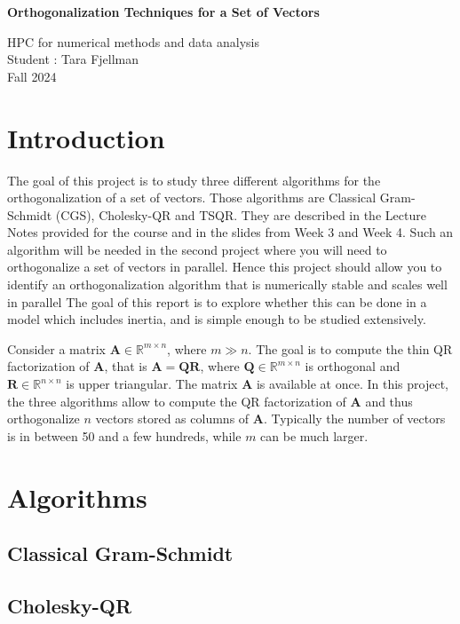 \documentclass[a4paper, 12pt,oneside]{article}
\begin{document}
 
	\begin{center}
	    \Large
	    \textbf{Orthogonalization Techniques for a Set of Vectors}
	        
	    \vspace{0.4cm}
	    \large
		HPC for numerical methods and data analysis \\
	    Student : Tara Fjellman \\
	    \small{Fall 2024}
	\end{center}
	\section{Introduction}
	The goal of this project is to study three different algorithms for the orthogonalization of a set of vectors. Those algorithms are Classical Gram-Schmidt (CGS), Cholesky-QR and TSQR\@. They are described in the Lecture Notes provided for the course and in the slides from Week 3 and Week 4. Such an algorithm will be needed in the second project where you will need to orthogonalize a set of vectors in parallel. Hence this project should allow you to identify an orthogonalization algorithm that is numerically stable and scales well in parallel
	The goal of this report is to explore whether this can be done in a model which includes inertia, and is simple enough to be studied extensively. 

	Consider a matrix $\mathbf{A} \in \mathbb{R}^{m \times n}$, where $m \gg n$. The goal is to compute the thin QR factorization of $\mathbf{A}$, that is $\mathbf{A}=\mathbf{Q R}$, where $\mathbf{Q} \in \mathbb{R}^{m \times n}$ is orthogonal and $\mathbf{R} \in \mathbb{R}^{n \times n}$ is upper triangular. The matrix $\mathbf{A}$ is available at once. In this project, the three algorithms allow to compute the QR factorization of $\mathbf{A}$ and thus orthogonalize $n$ vectors stored as columns of $\mathbf{A}$. Typically the number of vectors is in between 50 and a few hundreds, while $m$ can be much larger.
	\section{Algorithms}
		\subsection{Classical Gram-Schmidt}
		\subsection{Cholesky-QR}
\end{document}
